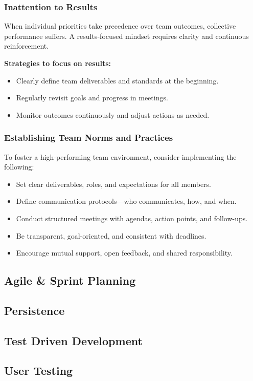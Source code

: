 \documentclass{article}
\begin{document}
\subsubsection{Inattention to Results}

When individual priorities take precedence over team outcomes, collective performance suffers. A results-focused mindset requires clarity and continuous reinforcement.

\vspace{1em}
\textbf{Strategies to focus on results:}
\begin{itemize}
    \item Clearly define team deliverables and standards at the beginning.
    \item Regularly revisit goals and progress in meetings.
    \item Monitor outcomes continuously and adjust actions as needed.
\end{itemize}

\subsubsection{Establishing Team Norms and Practices}

To foster a high-performing team environment, consider implementing the following:

\begin{itemize}
    \item Set clear deliverables, roles, and expectations for all members.
    \item Define communication protocols—who communicates, how, and when.
    \item Conduct structured meetings with agendas, action points, and follow-ups.
    \item Be transparent, goal-oriented, and consistent with deadlines.
    \item Encourage mutual support, open feedback, and shared responsibility.
\end{itemize}

\subsection{Agile \& Sprint Planning}

\subsection{Persistence}

\subsection{Test Driven Development}

\subsection{User Testing}
\end{document}
